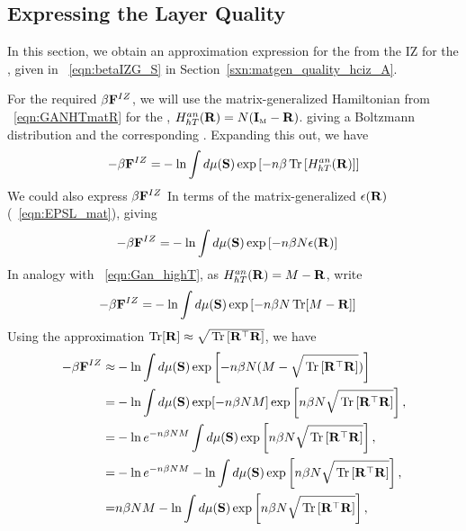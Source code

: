 \subsection{Expressing the Layer Quality}
\label{sxn:quality}

In this section, we obtain an approximation expression for the \LayerQualitySquared from the IZ \FreeEnergy for the \GeneralizationError, 
given in \EQN~\ref{eqn:betaIZG_S} in Section~\ref{sxn:matgen_quality_hciz_A}.

For the required \FreeEnergy $\beta\mathbf{F}^{IZ}$, we will use the matrix-generalized Hamiltonian
from \EQN~\ref{eqn:GANHTmatR} for the
\LayerQuality, $H^{an}_{hT}(\mathbf{R})=N(\mathbf{I}_{\text{\tiny M}}-\mathbf{R})$.
giving a Boltzmann distribution and the corresponding \ThermalAverage.  
Expanding this out, we have
\begin{align}
  \label{eqn:IZFE0}
  -\beta\mathbf{F}^{IZ} =& -  \ln \int d\mu(\mathbf{S}) \exp\left[-n\beta  \mbox{}\operatorname{Tr}\left[H^{an}_{hT}(\mathbf{R})\right]  \right] \\
\end{align}
We could also express $\beta\mathbf{F}^{IZ}$ In terms of the matrix-generalized \EffectivePotential $\epsilon(\mathbf{R})$
(\EQN~\ref{eqn:EPSL_mat}), giving
\begin{align}
  -\beta\mathbf{F}^{IZ} =& -  \ln \int d\mu(\mathbf{S}) \exp\left[-n\beta N \epsilon(\mathbf{R})  \right] 
\end{align}
In analogy with \EQN~\ref{eqn:Gan_highT}, 
as $H^{an}_{hT}(\mathbf{R})=M-\mathbf{R}$,  write
\begin{align}
-\beta\mathbf{F}^{IZ}  =& -  \ln \int d\mu(\mathbf{S}) \exp\left[-n\beta N \operatorname{Tr}[M-\mathbf{R}]  \right] 
\end{align}
Using the approximation $\operatorname{Tr}[\mathbf{R}]\approx\sqrt{\mbox{}\operatorname{Tr}\left[\mathbf{R}^{\top}\mathbf{R}\right]}$, we have
\begin{align}
  -\beta\mathbf{F}^{IZ} 
\approx& - \ln \int d\mu(\mathbf{S}) \exp\left[-n\beta N(M-\sqrt{\mbox{}\operatorname{Tr}\left[\mathbf{R}^{\top}\mathbf{R}\right]} ) \right] \\ 
\label{eqn:IZFE1}
=& -  \ln \int d\mu(\mathbf{S}) \exp[-n\beta NM]\exp\left[n\beta N\sqrt{\mbox{}\operatorname{Tr}\left[\mathbf{R}^{\top}\mathbf{R}\right]}\right], \\
\label{eqn:IZFE2}
=& -  \ln e^{-n\beta NM} \int d\mu(\mathbf{S}) \exp\left[n\beta N\sqrt{\mbox{}\operatorname{Tr}\left[\mathbf{R}^{\top}\mathbf{R}\right]}\right], \\
\label{eqn:IZFE3}
=& -  \ln e^{-n\beta NM} - \ln \int d\mu(\mathbf{S}) \exp\left[n\beta N\sqrt{\mbox{}\operatorname{Tr}\left[\mathbf{R}^{\top}\mathbf{R}\right]}\right], \\
\label{eqn:IZFE4}
=& n\beta NM - \ln \int d\mu(\mathbf{S}) \exp\left[n\beta N\sqrt{\mbox{}\operatorname{Tr}\left[\mathbf{R}^{\top}\mathbf{R}\right]}\right], 
\end{align}

